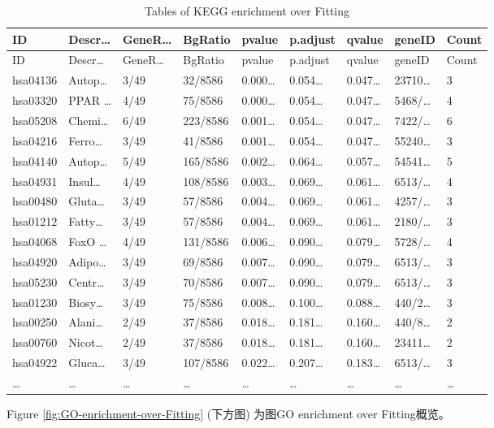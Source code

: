 \documentclass[
]{article}
\begin{document}
\begin{longtable}[]{@{}lllllllll@{}}
\caption{\label{tab:tables-of-KEGG-enrichment-over-Fitting}Tables of KEGG enrichment over Fitting}\tabularnewline
\toprule
ID & Descr\ldots{} & GeneR\ldots{} & BgRatio & pvalue & p.adjust & qvalue & geneID & Count\tabularnewline
\midrule
\endfirsthead
\toprule
ID & Descr\ldots{} & GeneR\ldots{} & BgRatio & pvalue & p.adjust & qvalue & geneID & Count\tabularnewline
\midrule
\endhead
hsa04136 & Autop\ldots{} & 3/49 & 32/8586 & 0.000\ldots{} & 0.054\ldots{} & 0.047\ldots{} & 23710\ldots{} & 3\tabularnewline
hsa03320 & PPAR \ldots{} & 4/49 & 75/8586 & 0.000\ldots{} & 0.054\ldots{} & 0.047\ldots{} & 5468/\ldots{} & 4\tabularnewline
hsa05208 & Chemi\ldots{} & 6/49 & 223/8586 & 0.001\ldots{} & 0.054\ldots{} & 0.047\ldots{} & 7422/\ldots{} & 6\tabularnewline
hsa04216 & Ferro\ldots{} & 3/49 & 41/8586 & 0.001\ldots{} & 0.054\ldots{} & 0.047\ldots{} & 55240\ldots{} & 3\tabularnewline
hsa04140 & Autop\ldots{} & 5/49 & 165/8586 & 0.002\ldots{} & 0.064\ldots{} & 0.057\ldots{} & 54541\ldots{} & 5\tabularnewline
hsa04931 & Insul\ldots{} & 4/49 & 108/8586 & 0.003\ldots{} & 0.069\ldots{} & 0.061\ldots{} & 6513/\ldots{} & 4\tabularnewline
hsa00480 & Gluta\ldots{} & 3/49 & 57/8586 & 0.004\ldots{} & 0.069\ldots{} & 0.061\ldots{} & 4257/\ldots{} & 3\tabularnewline
hsa01212 & Fatty\ldots{} & 3/49 & 57/8586 & 0.004\ldots{} & 0.069\ldots{} & 0.061\ldots{} & 2180/\ldots{} & 3\tabularnewline
hsa04068 & FoxO \ldots{} & 4/49 & 131/8586 & 0.006\ldots{} & 0.090\ldots{} & 0.079\ldots{} & 5728/\ldots{} & 4\tabularnewline
hsa04920 & Adipo\ldots{} & 3/49 & 69/8586 & 0.007\ldots{} & 0.090\ldots{} & 0.079\ldots{} & 6513/\ldots{} & 3\tabularnewline
hsa05230 & Centr\ldots{} & 3/49 & 70/8586 & 0.007\ldots{} & 0.090\ldots{} & 0.079\ldots{} & 6513/\ldots{} & 3\tabularnewline
hsa01230 & Biosy\ldots{} & 3/49 & 75/8586 & 0.008\ldots{} & 0.100\ldots{} & 0.088\ldots{} & 440/2\ldots{} & 3\tabularnewline
hsa00250 & Alani\ldots{} & 2/49 & 37/8586 & 0.018\ldots{} & 0.181\ldots{} & 0.160\ldots{} & 440/8\ldots{} & 2\tabularnewline
hsa00760 & Nicot\ldots{} & 2/49 & 37/8586 & 0.018\ldots{} & 0.181\ldots{} & 0.160\ldots{} & 23411\ldots{} & 2\tabularnewline
hsa04922 & Gluca\ldots{} & 3/49 & 107/8586 & 0.022\ldots{} & 0.207\ldots{} & 0.183\ldots{} & 6513/\ldots{} & 3\tabularnewline
\ldots{} & \ldots{} & \ldots{} & \ldots{} & \ldots{} & \ldots{} & \ldots{} & \ldots{} & \ldots{}\tabularnewline
\bottomrule
\end{longtable}

Figure \ref{fig:GO-enrichment-over-Fitting} (下方图) 为图GO enrichment over Fitting概览。
\end{document}
